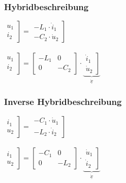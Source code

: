 \documentclass[a4paper,twocolumn,10pt]{article}
\begin{document}
\begin{minipage}[t]{0.23\textwidth}
\subsubsection*{Hybridbeschreibung}
$\left.\begin{matrix}u_1 \\ i_2\end{matrix}\right]=\left.\begin{matrix}-L_1\cdot \dot i_1 \\ -C_2\cdot \dot u_2\end{matrix}\right]$\\\\
$\left.\begin{matrix}u_1 \\ i_2\end{matrix}\right]=\begin{bmatrix}-L_1 & 0 \\ 0 & -C_2\end{bmatrix}\cdot \underbrace{\left.\begin{matrix}\dot i_1 \\ \dot u_2\end{matrix}\right]}_{\underline{\dot x}}$
\end{minipage}
\hfill
\begin{minipage}[t]{0.23\textwidth}
\subsubsection*{Inverse Hybridbeschreibung}
$\left.\begin{matrix}i_1 \\ u_2\end{matrix}\right]=\left.\begin{matrix}-C_1\cdot \dot u_1 \\ -L_2\cdot \dot i_2\end{matrix}\right]$\\\\
$\left.\begin{matrix}i_1 \\ u_2\end{matrix}\right]=\begin{bmatrix}-C_1 & 0 \\ 0 & -L_2\end{bmatrix}\cdot \underbrace{\left.\begin{matrix}\dot u_1 \\ \dot i_2\end{matrix}\right]}_{\underline{\dot x}}$
\end{minipage}
\end{document}
